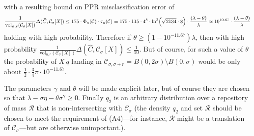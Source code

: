 \documentclass{report}
\newcommand{\vol}{\mathrm{vol}}
\newcommand{\1}{\mathbf{1}}
\newcommand{\mc}[1]{\mathcal{#1}}
\newcommand{\wh}[1]{\widehat{#1}}
\theoremstyle{alden}
\theoremstyle{aldenthm}
\theoremstyle{definition}
\theoremstyle{remark}
\begin{document}
with a resulting bound on PPR misclassification error of 
\begin{equation*}
\frac{1}{\vol_{n,r}(\mc{C}_{\sigma}[X])}\Delta(\wh{C},\mc{C}_{\sigma}[X]) \leq 175 \cdot \Phi_u(\mc{C}) \cdot \tau_u(\mc{C}) = 175 \cdot 115 \cdot 4^8 \cdot  \ln^2\Bigl(\sqrt{2134} \cdot 8 \Bigr) \cdot \frac{(\lambda - \theta)}{\lambda} \approx 10^{10.67} \cdot \frac{(\lambda - \theta)}{\lambda}
\end{equation*}
holding with high probability. Therefore if $\theta \geq (1 - 10^{-11.67})\lambda$, then with high probability $\frac{1}{\vol_{n,r}(\mc{C}_{\sigma}[X])}\Delta(\wh{C},\mc{C}_{\sigma}[X]) \leq \frac{1}{10}$. But of course, for such a value of $\theta$ the probability of $X ~ q$ landing in $\mc{C}_{\sigma, \sigma + r} = B(0,2\sigma) \setminus B(0,\sigma)$ would be only about $\frac{1}{2} \cdot \frac{3}{4}\pi \cdot 10^{-11.67}$. 


The parameters $\gamma$ and $\theta$ will be made explicit later, but of course they are chosen so that $\lambda - \sigma \eta - \theta \sigma^{\gamma} \geq 0$. Finally $q_2$ is an arbitrary distribution over a repository of mass $\mc{R}$ that is non-intersecting with $\mc{C}_{\sigma}$ (the density $q_2$ and set $\mc{R}$ should be chosen to meet the requirement of (A4)---for instance, $\mc{R}$ might be a translation of $\mc{C}_{\sigma}$---but are otherwise unimportant.). 
\end{document}
